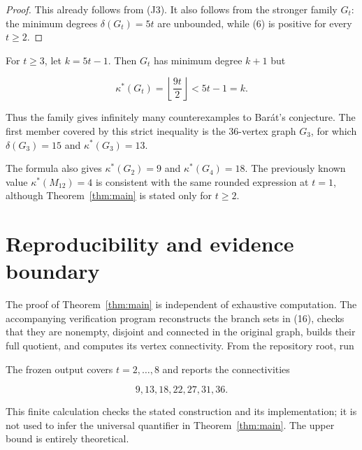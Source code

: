 \documentclass[11pt]{article}
\begin{document}
\begin{proof}

This already follows from (J3). It also follows from the stronger family
$G_t$: the minimum degrees $\delta(G_t)=5t$ are unbounded, while (6) is
positive for every $t\geq2$.
\end{proof}


For $t\geq3$, let $k=5t-1$. Then $G_t$ has minimum degree $k+1$ but

\nopagebreak[4]
\[
\kappa^*(G_t)=\left\lfloor\frac{9t}{2}\right\rfloor<5t-1=k.
\]

Thus the family gives infinitely many counterexamples to Barát's conjecture.
The first member covered by this strict inequality is the 36-vertex graph
$G_3$, for which $\delta(G_3)=15$ and $\kappa^*(G_3)=13$.

The formula also gives $\kappa^*(G_2)=9$ and $\kappa^*(G_4)=18$. The previously
known value $\kappa^*(M_{12})=4$ is consistent with the same rounded expression
at $t=1$, although Theorem~\ref{thm:main} is stated only for $t\geq2$.

\section{Reproducibility and evidence boundary}


The proof of Theorem~\ref{thm:main} is independent of exhaustive computation. The
accompanying verification program reconstructs the branch sets in (16), checks
that they are nonempty, disjoint and connected in the original graph, builds
their full quotient, and computes its vertex connectivity. From the repository
root, run

\begin{quote}\small

\end{quote}


The frozen output covers $t=2,\ldots,8$ and reports the connectivities

\nopagebreak[4]
\[
9,13,18,22,27,31,36.
\]

This finite calculation checks the stated construction and its implementation;
it is not used to infer the universal quantifier in Theorem~\ref{thm:main}. The upper bound
is entirely theoretical.
\end{document}
